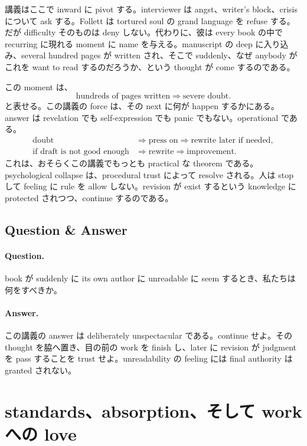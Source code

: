 講義はここで inward に pivot する。interviewer は angst、writer's block、crisis について ask する。Follett は tortured soul の grand language を refuse する。だが difficulty そのものは deny しない。代わりに、彼は every book の中で recurring に現れる moment に name を与える。manuscript の deep に入り込み、several hundred pages が written され、そこで suddenly、なぜ anybody がこれを want to read するのだろうか、という thought が come するのである。

この moment は、
\begin{equation}
\text{hundreds of pages written} \Rightarrow \text{severe doubt}.
\end{equation}
と表せる。この講義の force は、その next に何が happen するかにある。answer は revelation でも self-expression でも panic でもない。operational である。
\begin{align}
\text{doubt} &\Rightarrow \text{press on} \Rightarrow \text{rewrite later if needed},\\
\text{if draft is not good enough} &\Rightarrow \text{rewrite} \Rightarrow \text{improvement}.
\end{align}
これは、おそらくこの講義でもっとも practical な theorem である。psychological collapse は、procedural trust によって resolve される。人は stop して feeling に rule を allow しない。revision が exist するという knowledge に protected されつつ、continue するのである。

\subsection{Question \& Answer}

\paragraph{Question.} book が suddenly に its own author に unreadable に seem するとき、私たちは何をすべきか。

\paragraph{Answer.} この講義の answer は deliberately unspectacular である。continue せよ。その thought を脇へ置き、目の前の work を finish し、later に revision が judgment を pass することを trust せよ。unreadability の feeling には final authority は granted されない。

\section{standards、absorption、そして work への love}


